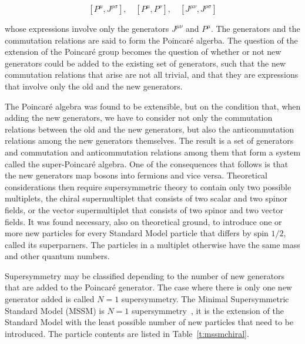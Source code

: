 $$[P^\mu, J^{\rho\sigma}], \quad [P^{\mu}, P^{\nu}], \quad [J^{\mu\nu},
		J^{\rho\sigma}]$$

whose expressions involve only the generators $J^{\mu\nu}$ and $P^{\mu}$. The
generators and the commutation relations are said to form the Poincar\'{e}
algerba. The question of the extension of the Poincar\'{e} group becomes the
question of whether or not new generators could be added to the existing set of
generators, such that the new commutation relations that arise are not all
trivial, and that they are expressions that involve only the old and the new
generators.

The Poincar\'{e} algebra was found to be extensible, but on the condition that,
when adding the new generators, we have to consider not only the commutation
relations between the old and the new generators, but also the anticommutation
relations among the new generators themselves. The result is a set of
generators and commutation and anticommutation relations among them that form a
system called the super-Poincar\'{e} algebra. One of the consequences that
follows is that the new generators map bosons into fermions and vice versa.
Theoretical considerations then require supersymmetric theory to contain only
two possible multiplets, the chiral supermultiplet that consists of two scalar
and two spinor fields, or the vector supermultiplet that consists of two spinor
and two vector fields. It was found necessary, also on theoretical ground, to
introduce one or more new particles for every Standard Model particle that
differs by spin $1/2$, called its superparners. The particles in a multiplet
otherwise have the same mass and other quantum numbers.

Supersymmetry may be classified depending to the number of new generators that
are added to the Poincar\'{e} generator. The case where there is only one new
generator added is called $N=1$ supersymmetry. The Minimal Supersymmetric
Standard Model (MSSM) is $N=1$ supersymmetry~\cite{susytext01, susytext02}, it
is the extension of the Standard Model with the least possible number of new
particles that need to be introduced. The particle contents are listed in
Table~\ref{t:mssmchiral}.

